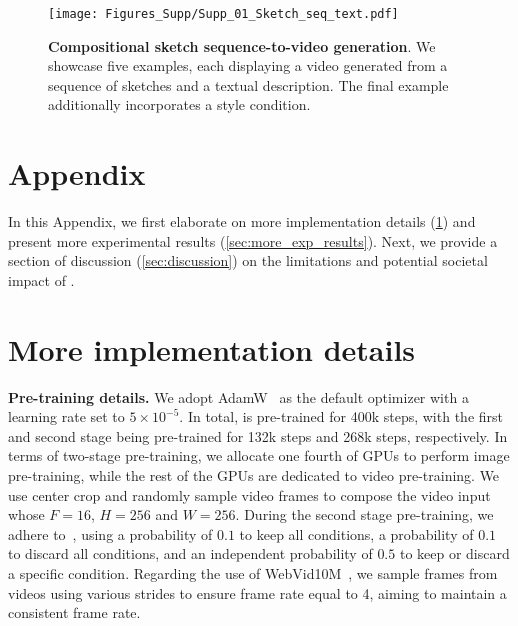 

\begin{figure}[t]
    \centering
    \texttt{[image: Figures\_Supp/Supp\_01\_Sketch\_seq\_text.pdf]}
     \vspace{-1.5em}
    \caption{
    \small
    \textbf{Compositional sketch sequence-to-video generation}.
    We showcase five examples, each displaying a video generated from a sequence of sketches and a textual description.
    The final example additionally incorporates a style condition.
    }
    \label{fig:sketch_sequence}
    \vspace{-5mm}
\end{figure}



\appendix
\section*{Appendix}
In this Appendix, we first elaborate on more implementation details (\cref{sec:more_imple_details}) and present more experimental results  (\cref{sec:more_exp_results}).
Next, we provide a section of discussion (\cref{sec:discussion}) on the limitations and potential societal impact of \method. 



\section{More implementation details}
\label{sec:more_imple_details}

\textbf{Pre-training details.}
We adopt AdamW~\cite{loshchilov2017AdamW} as the default optimizer with a learning rate set to $5\times 10^{-5}$.
In total, \method is pre-trained for 400k steps, with the first and second stage being pre-trained for 132k steps and 268k steps, respectively.
In terms of two-stage pre-training, we allocate one fourth of GPUs to perform image pre-training, while the rest of the GPUs are dedicated to video pre-training.
We use center crop and randomly sample video frames to compose the video input whose $F = 16$, $H = 256$ and $W = 256$.
During the second stage pre-training, we adhere to~\cite{huang2023composer}, using a probability of $0.1$ to keep all conditions, a probability of $0.1$ to discard all conditions, and an independent probability of $0.5$ to keep or discard a specific condition.
Regarding the use of WebVid10M~\cite{2021Frozen}, we sample frames from videos using various strides to ensure frame rate equal to 4, aiming to maintain a consistent frame rate.


